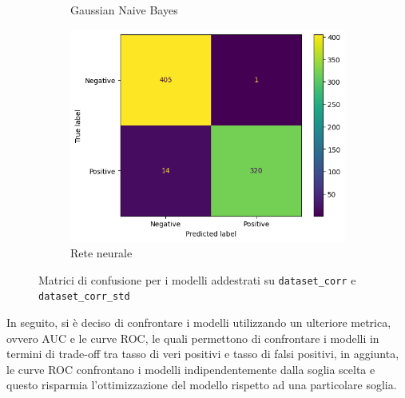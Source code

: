 \begin{figure}[!ht]
\begin{subfigure}{.45\textwidth}
        \caption{Gaussian Naive Bayes}
        \label{fig:matrice_di_confusione_per_GNB_corr}
    \end{subfigure}
    \hfill
    \begin{subfigure}{.45\textwidth}
        \centering
        \includegraphics[width=\textwidth]{img/rete/matrice_confusione.png}
        \caption{Rete neurale}
        \label{fig:matrice_di_confusione_per_NN_corr}
    \end{subfigure}
    \caption{Matrici di confusione per i modelli addestrati su \texttt{dataset\_corr} e \texttt{dataset\_corr\_std}}
    \label{fig:matrice_di_confusione_per_corr}
\end{figure}

In seguito, si è deciso di confrontare i modelli utilizzando un ulteriore metrica,
ovvero AUC e le curve ROC, le quali permettono di confrontare i modelli in
termini di trade-off tra tasso di veri positivi e tasso di falsi positivi, in
aggiunta, le curve ROC confrontano i modelli indipendentemente dalla soglia
scelta e questo risparmia l'ottimizzazione del modello rispetto ad una
particolare soglia.

